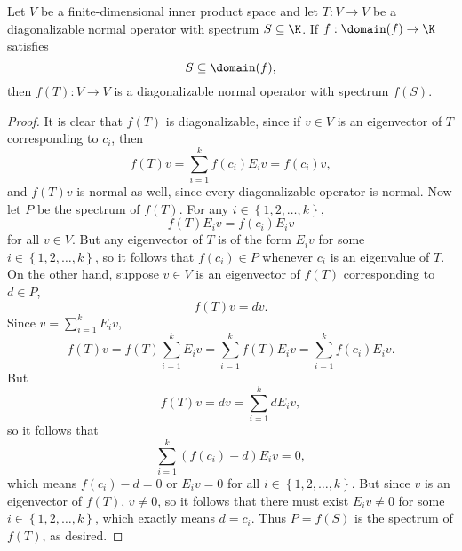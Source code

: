 \documentclass[linearalgebraII]{subfiles}
\begin{document}
    \begin{prop}{}
        Let $V$ be a finite-dimensional inner product space and let $T:V\to V$ be a diagonalizable normal operator with spectrum $S\subseteq\K$. If $f:\domain(f)\to\K$ satisfies
        \begin{equation*}
            S\subseteq \domain(f),
        \end{equation*}
        then $f(T):V\to V$ is a diagonalizable normal operator with spectrum $f(S)$. 
    \end{prop}

    \begin{proof}
        It is clear that $f(T)$ is diagonalizable, since if $v\in V$ is an eigenvector of $T$ corresponding to $c_i$, then
        \begin{equation*}
            f(T)v = \sum^{k}_{i=1} f\left( c_i \right) E_iv = f\left( c_i \right) v,
        \end{equation*}
        and $f(T)v$ is normal as well, since every diagonalizable operator is normal. Now let $P$ be the spectrum of $f(T)$. For any $i\in\left\lbrace 1,2,\ldots,k \right\rbrace$, 
        \begin{equation*}
            f(T)E_iv = f\left( c_i \right) E_iv
        \end{equation*}
        for all $v\in V$. But any eigenvector of $T$ is of the form $E_iv$ for some $i\in\left\lbrace 1,2,\ldots,k \right\rbrace$, so it follows that $f\left( c_i \right)\in P$ whenever $c_i$ is an eigenvalue of $T$. On the other hand, suppose $v\in V$ is an eigenvector of $f(T)$ corresponding to $d\in P$,
        \begin{equation*}
            f(T)v = dv.
        \end{equation*}
        Since $v = \sum^{k}_{i=1} E_iv$,
        \begin{equation*}
            f(T)v = f(T) \sum^{k}_{i=1} E_iv = \sum^{k}_{i=1} f(T)E_iv = \sum^{k}_{i=1} f\left( c_i \right) E_iv.
        \end{equation*}
        But
        \begin{equation*}
            f(T)v = dv = \sum^{k}_{i=1} dE_iv,
        \end{equation*}
        so it follows that 
        \begin{equation*}
            \sum^{k}_{i=1} \left( f\left( c_i \right) -d \right) E_iv = 0,
        \end{equation*}
        which means $f\left( c_i \right) - d = 0$ or $E_iv = 0$ for all $i\in\left\lbrace 1,2,\ldots,k \right\rbrace$. But since $v$ is an eigenvector of $f(T)$, $v\neq 0$, so it follows that there must exist $E_iv\neq 0$ for some $i\in\left\lbrace 1,2,\ldots,k \right\rbrace$, which exactly means $d = c_i$. Thus $P = f(S)$ is the spectrum of $f(T)$, as desired. 
    \end{proof}
\end{document}
